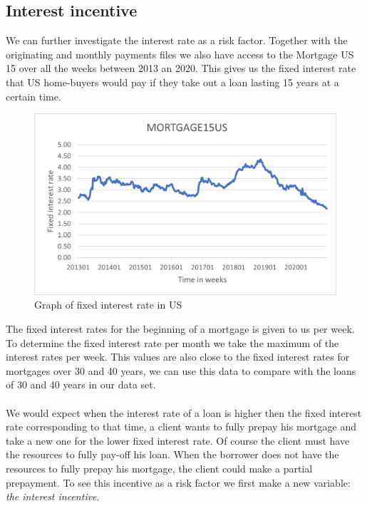 \subsection{Interest incentive}
    We can further investigate the interest rate as a risk factor. 
    Together with the originating and monthly payments files we 
    also have access to the Mortgage US 15 over all the weeks 
    between 2013 an 2020. This gives us the fixed interest rate 
    that US home-buyers would pay if they take out a loan lasting 
    15 years at a certain time.
    \begin{figure}[H]
        \centering
        \includegraphics[scale=0.7]{Figures/mortgage15US.png}
        \caption{
            Graph of fixed interest rate in US
            }
        \label{mortgage15us}
    \end{figure}
    The fixed interest rates for the beginning of a mortgage is 
    given to us per week. To determine the fixed interest rate 
    per month we take the maximum of the interest rates per week. 
    This values are also close to the fixed interest rates for 
    mortgages over 30 and 40 years, we can use this data to compare 
    with the loans of 30 and 40 years in our data set.
    \\\\
    We would expect when the interest rate of a loan is higher then 
    the fixed interest rate corresponding to that time, a client wants 
    to fully prepay his mortgage and take a new one for the lower 
    fixed interest rate. Of course the client must have the resources 
    to fully pay-off his loan. When the borrower does not have the 
    resources to fully prepay his mortgage, the client could make 
    a partial prepayment. To see this incentive as a risk factor we 
    first make a new variable: \textit{the interest incentive}. 
